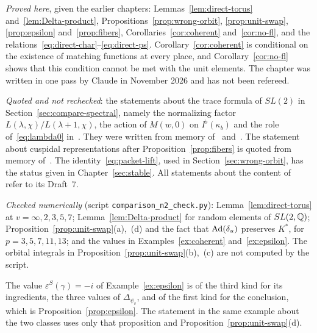 \begin{remarkrev}\label{rem:compare-status}
\emph{Proved here}, given the earlier chapters:
Lemmas~\ref{lem:direct-torus} and~\ref{lem:Delta-product},
Propositions~\ref{prop:wrong-orbit}, \ref{prop:unit-swap},
\ref{prop:epsilon} and~\ref{prop:fibers},
Corollaries~\ref{cor:coherent} and~\ref{cor:no-fl}, and the
relations~\eqref{eq:direct-char}--\eqref{eq:direct-ps}.
Corollary~\ref{cor:coherent} is conditional on the existence of matching
functions at every place, and Corollary~\ref{cor:no-fl} shows that this
condition cannot be met with the unit elements. The chapter was written
in one pass by Claude in November 2026 and has not been refereed.

\emph{Quoted and not rechecked}: the statements about the trace formula
of $SL(2)$ in Section~\ref{sec:compare-spectral}, namely the normalizing
factor $L(\lambda,\chi)/L(\lambda+1,\chi)$, the action of $M(w,0)$ on
$I^\flat(\kappa_b)$ and the role of~\eqref{eq:lambda0} in~\cite{LL79}.
They were written from memory of~\cite{LL79} and~\cite{GJ79}. The
statement about cuspidal representations after
Proposition~\ref{prop:fibers} is quoted from memory
of~\cite{Wa80,Wa91}. The identity~\eqref{eq:packet-lift}, used in
Section~\ref{sec:wrong-orbit}, has the status given in
Chapter~\ref{sec:stable}. All statements about the content
of~\cite{JC26} refer to its Draft~7.

\emph{Checked numerically} (script \texttt{comparison\_n2\_check.py}):
Lemma~\ref{lem:direct-torus} at $v=\infty,2,3,5,7$;
Lemma~\ref{lem:Delta-product} for random elements of $SL(2,\mathbb{Q})$;
Proposition~\ref{prop:unit-swap}(a),~(d) and the fact that
$\operatorname{Ad}(\delta_u)$ preserves $K^*$, for $p=3,5,7,11,13$; and the values in
Examples~\ref{ex:coherent} and~\ref{ex:epsilon}. The orbital integrals in
Proposition~\ref{prop:unit-swap}(b),~(c) are not computed by the script.
\end{remarkrev}

\begin{example}\label{ex:status-compare}
The value $\varepsilon^S(\gamma)=-i$ of Example~\ref{ex:epsilon} is of the
third kind for its ingredients, the three values of $\Delta_{\psi_v}$, and
of the first kind for the conclusion, which is
Proposition~\ref{prop:epsilon}. The statement in the same example
about the two classes uses only that proposition and
Proposition~\ref{prop:unit-swap}(d).
\end{example}
